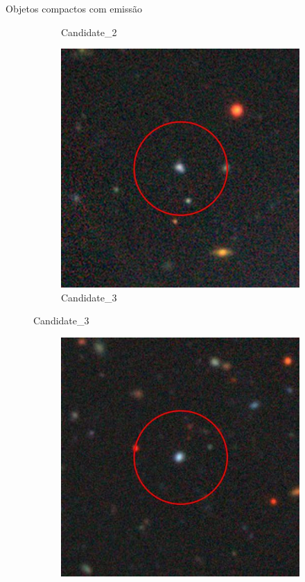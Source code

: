 \begin{frame}[c]{Objetos compactos com emissão}
\begin{figure}[h]
\begin{subfigure}[b]{0.22\textwidth}
        \caption{Candidate\_2}
    \end{subfigure}
    \begin{subfigure}[b]{0.22\textwidth}
        \includegraphics[width=\textwidth]{images/proposatal_candidatas_2/Candidate_3.png}
        \caption{Candidate\_3}
    \end{subfigure}
\end{figure}
\vspace{-0.5cm}
\begin{figure}[h]
    \begin{subfigure}[b]{0.22\textwidth}
        \includegraphics[width=\textwidth]{images/proposatal_candidatas_2/Candidate_4.png}

\end{subfigure}
\end{figure}
\end{frame}
